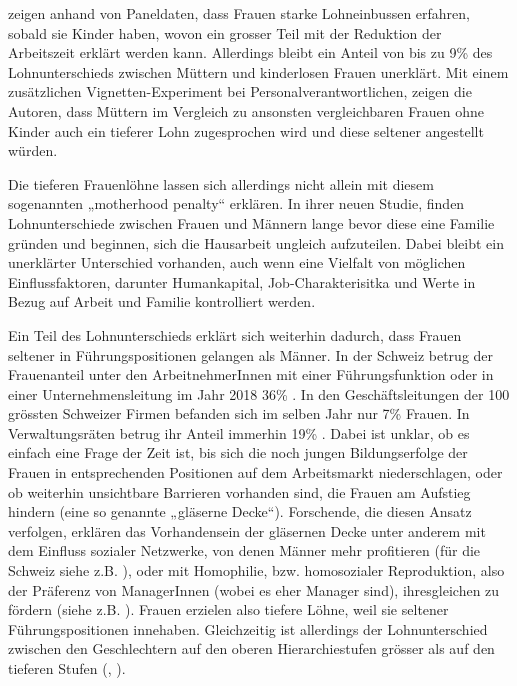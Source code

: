 \documentclass[a4paper,12pt]{article}
\begin{document}
\cite{Oesch:2017} zeigen anhand von Paneldaten, dass Frauen starke Lohneinbussen erfahren, sobald sie Kinder haben, wovon ein grosser Teil mit der Reduktion der Arbeitszeit erklärt werden kann. Allerdings bleibt ein Anteil von bis zu 9\% des Lohnunterschieds zwischen Müttern und kinderlosen Frauen unerklärt. Mit einem zusätzlichen Vignetten-Experiment bei Personalverantwortlichen, zeigen die Autoren, dass Müttern im Vergleich zu ansonsten vergleichbaren Frauen ohne Kinder auch ein tieferer Lohn zugesprochen wird und diese seltener angestellt würden. 

Die tieferen Frauenlöhne lassen sich allerdings nicht allein mit diesem sogenannten „motherhood penalty“  \citep{Budig-2001} erklären. In ihrer neuen Studie, finden \cite{Combet-2019} Lohnunterschiede zwischen Frauen und Männern lange bevor diese eine Familie gründen und beginnen, sich die Hausarbeit ungleich aufzuteilen. Dabei bleibt ein unerklärter Unterschied vorhanden, auch wenn eine Vielfalt von möglichen Einflussfaktoren, darunter Humankapital, Job-Charakterisitka und Werte in Bezug auf Arbeit und Familie kontrolliert werden. 

Ein Teil des Lohnunterschieds erklärt sich weiterhin dadurch, dass Frauen
seltener in Führungspositionen gelangen als Männer. In der Schweiz betrug der
Frauenanteil unter den ArbeitnehmerInnen mit einer Führungsfunktion oder in
einer Unternehmensleitung im Jahr 2018 36\% \citep{BFS-2019c}. In den
Geschäftsleitungen der 100 grössten Schweizer Firmen befanden sich im selben
Jahr nur 7\% Frauen. In Verwaltungsräten betrug ihr Anteil immerhin 19\%
\citep{Schillingreport-2018}. Dabei ist unklar, ob es einfach eine Frage der
Zeit ist, bis sich die noch jungen Bildungserfolge der Frauen in entsprechenden
Positionen auf dem Arbeitsmarkt niederschlagen, oder ob weiterhin unsichtbare
Barrieren vorhanden sind, die Frauen am Aufstieg hindern (eine so genannte
„gläserne Decke“). Forschende, die diesen Ansatz verfolgen, erklären das
Vorhandensein der gläsernen Decke unter anderem mit dem Einfluss sozialer
Netzwerke, von denen Männer mehr profitieren (für die Schweiz siehe z.B.
\citealp{Rost-2010}), oder mit Homophilie, bzw. homosozialer Reproduktion, also
der Präferenz von ManagerInnen (wobei es eher Manager sind), ihresgleichen zu
fördern (siehe z.B. \citealp{Bihagen-Ohls-2006,Holst-Wiemer-2010,Ochsenfeld-2012}). Frauen erzielen
also tiefere Löhne, weil sie seltener Führungspositionen innehaben.
Gleichzeitig ist allerdings der Lohnunterschied zwischen den Geschlechtern auf
den oberen Hierarchiestufen grösser als auf den tieferen Stufen
(\citealp{Blau-Kahn-2016}, \citealp[42]{Strub-Bannwart-2017}).
\end{document}
